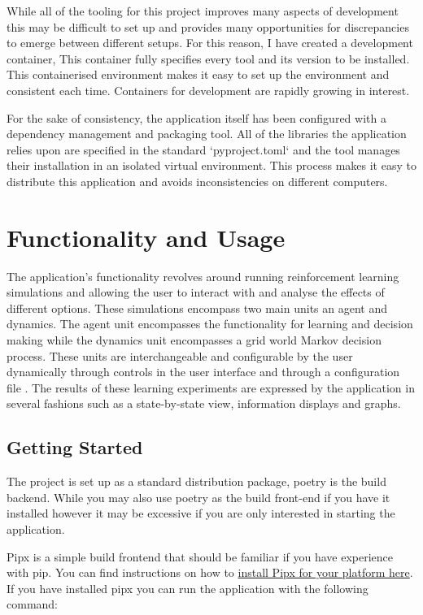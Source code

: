 \documentclass[]{final_report}
\begin{document}
While all of the tooling for this project improves many aspects of development this may be difficult to set up and provides many opportunities for discrepancies to emerge between different setups. For this reason, I have created a development container, This container fully specifies every tool and its version to be installed. This containerised environment makes it easy to set up the environment and consistent each time. Containers for development are rapidly growing in interest\cite{developmentContainers}. 

For the sake of consistency, the application itself has been configured with a dependency management and packaging tool. All of the libraries the application relies upon are specified in the standard `pyproject.toml` and the tool manages their installation in an isolated virtual environment. This process makes it easy to distribute this application and avoids inconsistencies on different computers.

\section{Functionality and Usage}

The application's functionality revolves around running reinforcement learning simulations and allowing the user to interact with and analyse the effects of different options. These simulations encompass two main units an agent and dynamics. The agent unit encompasses the functionality for learning and decision making while the dynamics unit encompasses a grid world Markov decision process. These units are interchangeable and configurable by the user dynamically through controls in the user interface and through a configuration file . The results of these learning experiments are expressed by the application in several fashions such as a state-by-state view, information displays and graphs.


\subsection{Getting Started}

The project is set up as a standard distribution package, poetry is the build backend. While you may also use poetry as the build front-end if you have it installed however it may be excessive if you are only interested in starting the application.

Pipx is a simple build frontend that should be familiar if you have experience with pip. You can find instructions on how to \href{https://pipx.pypa.io/stable/installation/}{install Pipx for your platform here}. If you have installed pipx you can run the application with the following command:
\end{document}

